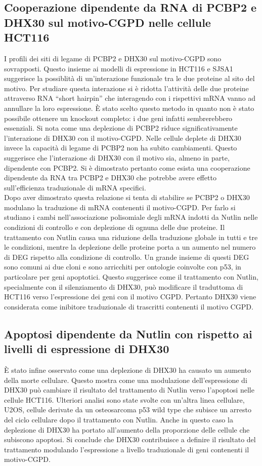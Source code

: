   \subsection{Cooperazione dipendente da RNA di PCBP2 e DHX30 sul motivo-CGPD nelle cellule HCT116}
  I profili dei siti di legame di PCBP2 e DHX30 sul motivo-CGPD sono sovrapposti.
  Questo insieme ai modelli di espressione in HCT116 e SJSA1 suggerisce la possiblit\`a di un'interazione funzionale tra le due proteine al sito del motivo.
  Per studiare questa interazione si \`e ridotta l'attivit\`a delle due proteine attraverso RNA ``short hairpin'' che interagendo con i rispettivi mRNA vanno ad annullare la loro espressione.
  \`E stato scelto questo metodo in quanto non \`e stato possibile ottenere un knockout completo: i due geni infatti sembrerebbero essenziali.
  Si nota come una deplezione di PCBP2 riduce significativamente l'interazione di DHX30 con il motivo-CGPD.
  Nelle cellule deplete di DHX30 invece la capacit\`a di legame di PCBP2 non ha subito cambiamenti.
  Questo suggerisce che l'interazione di DHX30 con il motivo sia, almeno in parte, dipendente con PCBP2.
  Si \`e dimostrato pertanto come esista una cooperazione dipendente da RNA tra PCBP2 e DHX30 che potrebbe avere effetto sull'efficienza traduzionale di mRNA specifici.\\
  Dopo aver dimostrato questa relazione si tenta di stabilire se PCBP2 o DHX30 modulano la traduzione di mRNA contenenti il motivo-CGPD.
  Per farlo si studiano i cambi nell'associazione polisomiale degli mRNA indotti da Nutlin nelle condizioni di controllo e con deplezione di ognuna delle due proteine.
  Il trattamento con Nutlin causa una riduzione della traduzione globale in tutti e tre le condizioni, mentre la deplezione delle proteine porta a un aumento nel numero di DEG rispetto alla condizione di controllo.
  Un grande insieme di questi DEG sono comuni ai due cloni e sono arricchiti per ontologie coinvolte con p53, in particolare per geni apoptotici.
  Questo suggerisce come il trattamento con Nutlin, specialmente con il silenziamento di DHX30, pu\`o modificare il traduttoma di HCT116 verso l'espressione dei geni con il motivo CGPD.
  Pertanto DHX30 viene considerata come inibitore traduzionale di trascritti contenenti il motivo CGPD.

  \subsection{Apoptosi dipendente da Nutlin con rispetto ai livelli di espressione di DHX30}
  \`E stato infine osservato come una deplezione di DHX30 ha causato un aumento della morte cellulare.
  Questo mostra come una modulazione dell'espressione di DHX30 pu\`o cambiare il risultato del trattamento di Nutlin verso l'apoptosi nelle cellule HCT116.
  Ulteriori analisi sono state svolte con un'altra linea cellulare, U2OS, cellule derivate da un osteosarcoma p53 wild type che subisce un arresto del ciclo cellulare dopo il trattamento con Nutlin.
  Anche in questo caso la deplezione di DHX30 ha portato all'aumento della proporzione delle cellule che subiscono apoptosi.
  Si conclude che DHX30 contribuisce a definire il risultato del trattamento modulando l'espressione a livello traduzionale di geni contenenti il motivo-CGPD.

